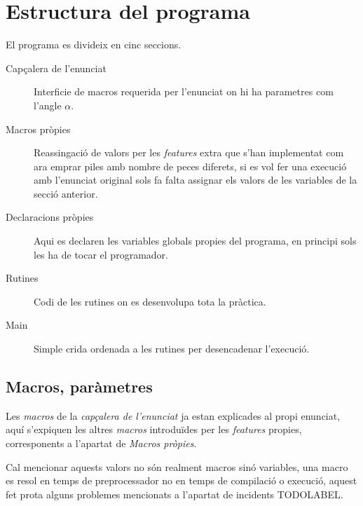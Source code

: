 \section{Estructura del programa}
El programa es divideix en cinc seccions.

\begin{description}
\item [Capçalera de l'enunciat] Interficie de macros requerida per l'enunciat on hi ha parametres com l'angle $\alpha$.
\item [Macros pròpies] Reassingació de valors per les \emph{features} extra que s'han implementat com ara emprar
piles amb nombre de peces diferets, si es vol fer una execució amb l'enunciat original sols fa falta
assignar els valors de les variables de la secció anterior.
\item [Declaracions pròpies] Aqui es declaren les variables globals propies del programa, en principi sols les 
ha de tocar el programador.
\item [Rutines] Codi de les rutines on es desenvolupa tota la pràctica.
\item [Main] Simple crida ordenada a les rutines per desencadenar l'execució.
\end{description}

\subsection{Macros, paràmetres}
Les \emph{macros} de la \emph{capçalera de l'enunciat} ja estan explicades al propi enunciat, aquí s'expiquen les
altres \emph{macros} introduïdes per les \emph{features} propies, corresponents a l'apartat de 
\emph{Macros pròpies}.

Cal mencionar aquests valors no són realment macros sinó variables, una macro es resol en temps de preprocessador
no en temps de compilació o execució, aquest fet prota alguns problemes mencionats a l'apartat de incidents TODOLABEL.

